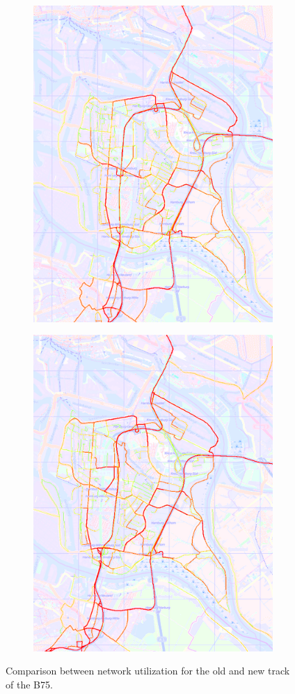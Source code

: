 \begin{figure}[!ht]
	\begin{subfigure}
		\centering
		\includegraphics[width=.475\linewidth]{extending/figures/Evacuation/b75utilizationold}
	\end{subfigure}\hfill
	\begin{subfigure}
		\centering
		\includegraphics[width=.475\linewidth]{extending/figures/Evacuation/b75utilizationnew}
	\end{subfigure}
	\caption{Comparison between network utilization for the old and new track of the B75.}
	\label{fig:b75utilization}
\end{figure}
